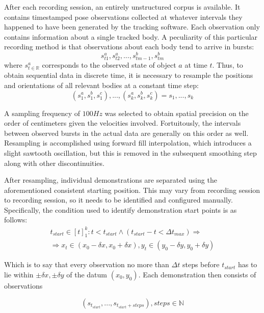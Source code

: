 \documentclass{article}
\begin{document}
After each recording session, an entirely unstructured corpus is available. It contains timestamped pose observations collected at whatever intervals they happened to have been generated by the tracking software. Each observation only contains information about a single tracked body. A peculiarity of this particular recording method is that observations about each body tend to arrive in bursts:
\begin{equation}
    s^a_{t1}, s^a_{t2}, ..., s^b_{tm-1}, s^b_{tm}
\end{equation}
where $s^a_{t \in \mathbb{R}}$ corresponds to the observed state of object $a$ at time $t$.
Thus, to obtain sequential data in discrete time, it is necessary to resample the positions and orientations of all relevant bodies at a constant time step:
\begin{equation}
    (s^a_{1}, s^b_{1}, s^c_{1}), ..., (s^a_{k}, s^b_{k}, s^c_{k}) = s_1, ..., s_k
\end{equation}

A sampling frequency of $100Hz$ was selected to obtain spatial precision on the order of centimeters given the velocities involved. Fortuitously, the intervals between observed bursts in the actual data are generally on this order as well. Resampling is accomplished using forward fill interpolation, which introduces a slight sawtooth oscillation, but this is removed in the subsequent smoothing step along with other discontinuities.

After resampling, individual demonstrations are separated using the aforementioned consistent starting position. This may vary from recording session to recording session, so it needs to be identified and configured manually. Specifically, the condition used to identify demonstration start points is as follows:
\begin{align}
	t_{start} \in [t]^k_1: t < t_{start} \land (t_{start} - t < \Delta t_{max}) \Rightarrow \nonumber \\
	\Rightarrow x_t \in (x_{0} - \delta x, x_{0} + \delta x ), y_t \in  (y_{0} - \delta y, y_{0} + \delta y )
\end{align}

Which is to say that every observation no more than $\Delta t$ steps before $t_{start}$ has to lie within $\pm \delta x, \pm \delta y$ of the datum $(x_0, y_0)$. Each demonstration then consists of observations 

\begin{equation}
	(s_{t_{start}}, ... , s_{t_{start}+steps}), steps \in \mathbb{N}
\end{equation}
	
\end{document}
